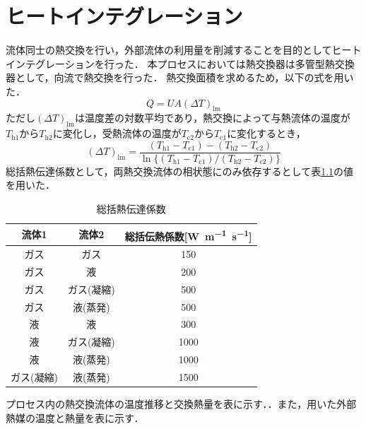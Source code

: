 \documentclass[a4j]{jsreport}
\begin{document}
\chapter{ヒートインテグレーション}
流体同士の熱交換を行い，外部流体の利用量を削減することを目的としてヒートインテグレーションを行った．
本プロセスにおいては熱交換器は多管型熱交換器として，向流で熱交換を行った．
熱交換面積を求めるため，以下の式を用いた．
\begin{equation}
    Q=UA(\Delta T)_\mathrm{lm}
\end{equation}
ただし$(\Delta T)_\mathrm{lm}$は温度差の対数平均であり，熱交換によって与熱流体の温度が$T_\mathrm{h1}$から$T_\mathrm{h2}$に変化し，受熱流体の温度が$T_\mathrm{c2}$から$T_\mathrm{c1}$に変化するとき，
\begin{equation}
    (\Delta T)_\mathrm{lm} = \frac{(T_\mathrm{h1} - T_\mathrm{c1}) - (T_\mathrm{h2} - T_\mathrm{c2})}{\ln\{(T_\mathrm{h1} - T_\mathrm{c1}) / (T_\mathrm{h2} - T_\mathrm{c2})\}}
\end{equation}
総括熱伝達係数として，両熱交換流体の相状態にのみ依存するとして表\ref{総括熱伝達係数}の値を用いた．
\begin{table}[htbp]
    \caption{総括熱伝達係数}
    \label{総括熱伝達係数}
    \begin{center}
        \begin{tabular}{ccc}\hline
            流体1        &  流体2       & 総括伝熱係数[\si{\watt\metre^{-1}\second^{-1}}]    \\   \hline
            ガス         &  ガス        &150   \\
            ガス         &   液        &200   \\
            ガス         &  ガス(凝縮)  &500    \\
            ガス         &  液(蒸発)    &500    \\
            液           &   液          &300   \\
            液           &  ガス(凝縮)  &1000    \\
            液           &  液(蒸発)    &1000    \\
            ガス(凝縮)    &  液(蒸発)  &1500       \\\hline
        \end{tabular}
    \end{center}
\end{table}
プロセス内の熱交換流体の温度推移と交換熱量を表に示す．．また，用いた外部熱媒の温度と熱量を表に示す．
\end{document}
